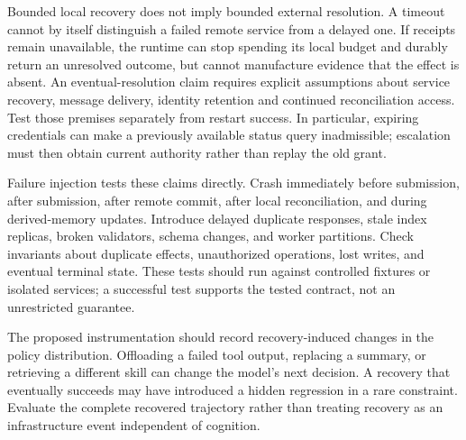 Bounded local recovery does not imply bounded external resolution. A timeout cannot by itself distinguish a failed remote service from a delayed one. If receipts remain unavailable, the runtime can stop spending its local budget and durably return an unresolved outcome, but cannot manufacture evidence that the effect is absent. An eventual-resolution claim requires explicit assumptions about service recovery, message delivery, identity retention and continued reconciliation access. Test those premises separately from restart success. In particular, expiring credentials can make a previously available status query inadmissible; escalation must then obtain current authority rather than replay the old grant.

Failure injection tests these claims directly. Crash immediately before submission, after submission, after remote commit, after local reconciliation, and during derived-memory updates. Introduce delayed duplicate responses, stale index replicas, broken validators, schema changes, and worker partitions. Check invariants about duplicate effects, unauthorized operations, lost writes, and eventual terminal state. These tests should run against controlled fixtures or isolated services; a successful test supports the tested contract, not an unrestricted guarantee.

The proposed instrumentation should record recovery-induced changes in the policy distribution. Offloading a failed tool output, replacing a summary, or retrieving a different skill can change the model's next decision. A recovery that eventually succeeds may have introduced a hidden regression in a rare constraint. Evaluate the complete recovered trajectory rather than treating recovery as an infrastructure event independent of cognition.

